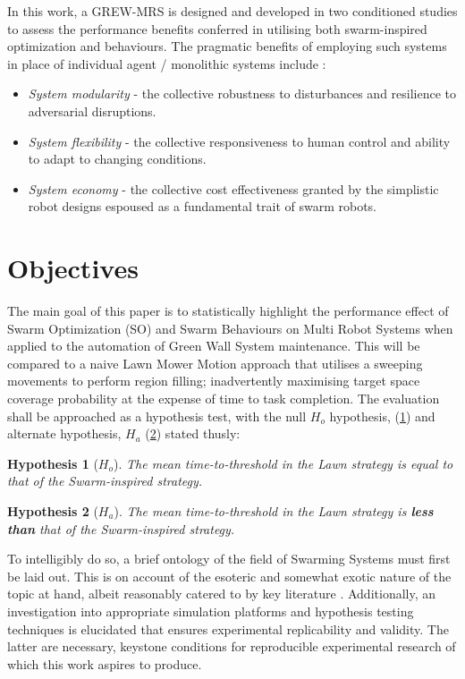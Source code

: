 \documentclass{report}
\newtheorem*{hyp}{Hypothesis}
\begin{document}
In this work, a GREW-MRS is designed and developed in two conditioned studies to assess the performance benefits conferred in utilising both swarm-inspired optimization and behaviours. The pragmatic benefits of employing such systems in place of individual agent / monolithic systems include \cite{Yang2018}:
\begin{itemize}
	\item \textit{System modularity} - the collective robustness to disturbances and resilience to adversarial disruptions.
	\item \textit{System flexibility} - the collective responsiveness to human control and ability to adapt to changing conditions.
	\item \textit{System economy} - the collective cost effectiveness granted by the simplistic robot designs espoused as a fundamental trait of swarm robots.
\end{itemize}

\section{Objectives}

The main goal of this paper is to statistically highlight the performance effect of Swarm Optimization (SO) and Swarm Behaviours on Multi Robot Systems when applied to the automation of Green Wall System maintenance. This will be compared to a naive Lawn Mower Motion \cite{Cao1988} approach that utilises a sweeping movements to perform region filling; inadvertently maximising target space coverage probability at the expense of time to task completion. The evaluation shall be approached as a hypothesis test, with the null $H_o$ hypothesis, (\ref{hyp:null}) and alternate hypothesis, $H_a$ (\ref{hyp:alt}) stated thusly:

\begin{hyp}[$H_o$] \label{hyp:null}
	The mean time-to-threshold in the Lawn strategy is \textit{equal} to that of the Swarm-inspired strategy.
\end{hyp}
\begin{hyp}[$H_a$] \label{hyp:alt}
	The mean time-to-threshold in the Lawn strategy is \textbf{less than} that of the Swarm-inspired strategy.
\end{hyp}

To intelligibly do so, a brief ontology of the field of Swarming Systems must first be laid out. This is on account of the esoteric and somewhat exotic nature of the topic at hand, albeit reasonably catered to by key literature \cite{Beni2005a} \cite{Iocchi2001} \cite{Galceran2013}. Additionally, an investigation into appropriate simulation platforms and hypothesis testing techniques is elucidated that ensures experimental replicability and validity. The latter are necessary, keystone conditions for reproducible experimental research of which this work aspires to produce.
\end{document}
